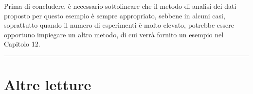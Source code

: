 \documentclass[
  12pt,
]{book}
\begin{document}
\normalsize

Prima di concludere, è necessario sottolineare che il metodo di analisi dei dati proposto per questo esempio è sempre appropriato, sebbene in alcuni casi, soprattutto quando il numero di esperimenti è molto elevato, potrebbe essere opportuno impiegare un altro metodo, di cui verrà fornito un esempio nel Capitolo 12.

\begin{center}\rule{0.5\linewidth}{0.5pt}\end{center}

\hypertarget{altre-letture-9}{%
\section{Altre letture}\label{altre-letture-9}}
\end{document}
